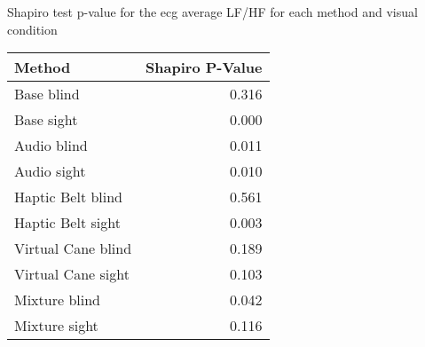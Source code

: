 
\centering
\caption{Shapiro test p-value for the ecg average LF/HF for each method and visual condition}
\label{tab:shapiro_ecg_lfhf}
\begin{tabular}{lr}
\toprule
            Method &  Shapiro P-Value \\
\midrule
        Base blind &            0.316 \\
        Base sight &            0.000 \\
       Audio blind &            0.011 \\
       Audio sight &            0.010 \\
 Haptic Belt blind &            0.561 \\
 Haptic Belt sight &            0.003 \\
Virtual Cane blind &            0.189 \\
Virtual Cane sight &            0.103 \\
     Mixture blind &            0.042 \\
     Mixture sight &            0.116 \\
\bottomrule
\end{tabular}
